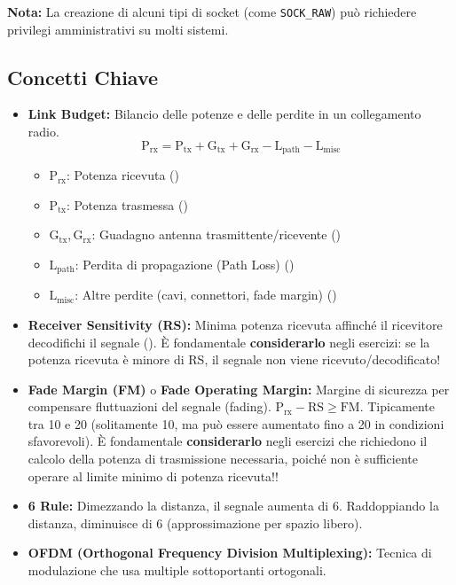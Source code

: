 \textbf{Nota:} La creazione di alcuni tipi di socket (come \texttt{SOCK\_RAW}) può richiedere privilegi amministrativi su molti sistemi.

\subsection{Concetti Chiave}
\begin{itemize}
    \item \textbf{Link Budget:} Bilancio delle potenze e delle perdite in un collegamento radio.
    \[ \text{P}_{\text{rx}} = \text{P}_{\text{tx}} + \text{G}_{\text{tx}} + \text{G}_{\text{rx}} - \text{L}_{\text{path}} - \text{L}_{\text{misc}} \]
    \begin{itemize}
        \item $\text{P}_{\text{rx}}$: Potenza ricevuta ()
        \item $\text{P}_{\text{tx}}$: Potenza trasmessa ()
        \item $\text{G}_{\text{tx}}, \text{G}_{\text{rx}}$: Guadagno antenna trasmittente/ricevente ()
        \item $\text{L}_{\text{path}}$: Perdita di propagazione (Path Loss) ()
        \item $\text{L}_{\text{misc}}$: Altre perdite (cavi, connettori, fade margin) ()
    \end{itemize}
    \item \textbf{Receiver Sensitivity (RS):} Minima potenza ricevuta affinché il ricevitore decodifichi il segnale (). È fondamentale \textbf{considerarlo} negli esercizi: se la potenza ricevuta è minore di RS, il segnale non viene ricevuto/decodificato!
    \item \textbf{Fade Margin (FM)} o \textbf{Fade Operating Margin:} Margine di sicurezza per compensare fluttuazioni del segnale (fading). $\text{P}_{\text{rx}} - \text{RS} \ge \text{FM}$. Tipicamente tra 10 e 20 (solitamente 10, ma può essere aumentato fino a 20 in condizioni sfavorevoli). È fondamentale \textbf{considerarlo} negli esercizi che richiedono il calcolo della potenza di trasmissione necessaria, poiché non è sufficiente operare al limite minimo di potenza ricevuta!!
    \item \textbf{6 Rule:} Dimezzando la distanza, il segnale aumenta di 6. Raddoppiando la distanza, diminuisce di 6 (approssimazione per spazio libero).
    \item \textbf{OFDM (Orthogonal Frequency Division Multiplexing):} Tecnica di modulazione che usa multiple sottoportanti ortogonali.

\end{itemize}

